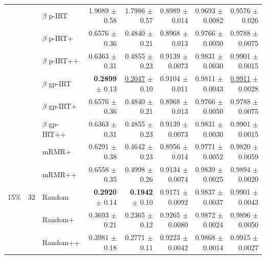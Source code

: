 \begin{longtable}{llp{}rrrrr}
 &  & $\beta$ p-IRT & 1.9089 {\scriptsize $\pm$ 0.58} & 1.7986 {\scriptsize $\pm$ 0.57} & 0.8989 {\scriptsize $\pm$ 0.014} & 0.9693 {\scriptsize $\pm$ 0.0082} & 0.9576 {\scriptsize $\pm$ 0.026} \\
 &  & $\beta$ p-IRT+ & 0.6576 {\scriptsize $\pm$ 0.36} & 0.4840 {\scriptsize $\pm$ 0.21} & 0.8968 {\scriptsize $\pm$ 0.013} & 0.9766 {\scriptsize $\pm$ 0.0050} & 0.9788 {\scriptsize $\pm$ 0.0075} \\
 &  & $\beta$ p-IRT++ & 0.6363 {\scriptsize $\pm$ 0.31} & 0.4855 {\scriptsize $\pm$ 0.23} & 0.9139 {\scriptsize $\pm$ 0.0073} & 0.9831 {\scriptsize $\pm$ 0.0030} & 0.9901 {\scriptsize $\pm$ 0.0015} \\
 &  & $\beta$ gp-IRT & \textbf{0.2899} {\scriptsize $\pm$ 0.13} & \underline{0.2047} {\scriptsize $\pm$ 0.10} & 0.9104 {\scriptsize $\pm$ 0.011} & 0.9811 {\scriptsize $\pm$ 0.0043} & \underline{0.9911} {\scriptsize $\pm$ 0.0028} \\
 &  & $\beta$ gp-IRT+ & 0.6576 {\scriptsize $\pm$ 0.36} & 0.4840 {\scriptsize $\pm$ 0.21} & 0.8968 {\scriptsize $\pm$ 0.013} & 0.9766 {\scriptsize $\pm$ 0.0050} & 0.9788 {\scriptsize $\pm$ 0.0075} \\
 &  & $\beta$ gp-IRT++ & 0.6363 {\scriptsize $\pm$ 0.31} & 0.4855 {\scriptsize $\pm$ 0.23} & 0.9139 {\scriptsize $\pm$ 0.0073} & 0.9831 {\scriptsize $\pm$ 0.0030} & 0.9901 {\scriptsize $\pm$ 0.0015} \\
 &  & mRMR+ & 0.6291 {\scriptsize $\pm$ 0.38} & 0.4642 {\scriptsize $\pm$ 0.23} & 0.8956 {\scriptsize $\pm$ 0.014} & 0.9771 {\scriptsize $\pm$ 0.0052} & 0.9820 {\scriptsize $\pm$ 0.0059} \\
 &  & mRMR++ & 0.6558 {\scriptsize $\pm$ 0.35} & 0.4998 {\scriptsize $\pm$ 0.26} & 0.9134 {\scriptsize $\pm$ 0.0074} & 0.9839 {\scriptsize $\pm$ 0.0025} & 0.9894 {\scriptsize $\pm$ 0.0020} \\
\midrule
15\% & 32 & Random & \textbf{0.2920} {\scriptsize $\pm$ 0.14} & \textbf{0.1942} {\scriptsize $\pm$ 0.10} & 0.9171 {\scriptsize $\pm$ 0.0092} & 0.9837 {\scriptsize $\pm$ 0.0037} & 0.9901 {\scriptsize $\pm$ 0.0043} \\
 &  & Random+ & 0.3693 {\scriptsize $\pm$ 0.21} & 0.2365 {\scriptsize $\pm$ 0.12} & 0.9265 {\scriptsize $\pm$ 0.0080} & 0.9872 {\scriptsize $\pm$ 0.0024} & 0.9896 {\scriptsize $\pm$ 0.0050} \\
 &  & Random++ & 0.3981 {\scriptsize $\pm$ 0.18} & 0.2771 {\scriptsize $\pm$ 0.11} & 0.9223 {\scriptsize $\pm$ 0.0042} & 0.9868 {\scriptsize $\pm$ 0.0014} & 0.9915 {\scriptsize $\pm$ 0.0027} \\

\end{longtable}
